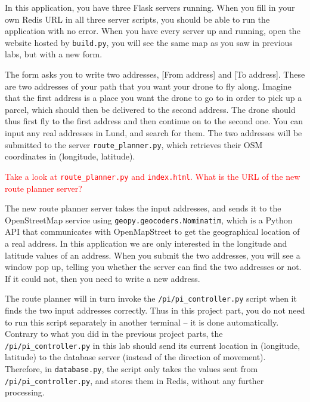 \documentclass{article}
\begin{document}
In this application, you have three Flask servers running. When you fill in your own Redis URL in all three server scripts, you should be able to run the application with no error. When you have every server up and running, open the website hosted by \verb!build.py!, you will see the same map as you saw in previous labs, but with a new form.

The form asks you to write two addresses, [From address] and [To address]. These are two addresses of your path that you want your drone to fly along. Imagine that the first address is a place you want the drone to go to in order to pick up a parcel, which should then be delivered to the second address. The drone should thus first fly to the first address and then continue on to the second one. You can input any real addresses in Lund, and search for them. The two addresses will be submitted to the server \verb!route_planner.py!, which retrieves their OSM coordinates in (longitude, latitude).

\vspace{0.5cm}
\parbox[t]{13cm}{\textcolor{red}{Take a look at \texttt{route\_planner.py} and \texttt{index.html}. What is the URL of the new route planner server?}} \vspace{0.5cm}

\noindent The new route planner server takes the input addresses, and sends it to the OpenStreetMap service using \verb!geopy.geocoders.Nominatim!, which is a Python API that communicates with OpenMapStreet to get the geographical location of a real address. In this application we are only interested in the longitude and latitude values of an address. When you submit the two addresses, you will see a window pop up, telling you whether the server can find the two addresses or not. If it could not, then you need to write a new address.

The route planner will in turn invoke the \verb!/pi/pi_controller.py! script when it finds the two input addresses correctly.
Thus in this project part, you do not need to run this script separately in another terminal -- it is done automatically. Contrary to what you did in the previous project parts, the \verb!/pi/pi_controller.py! in this lab should send its current location in (longitude, latitude) to the database server (instead of the direction of movement). Therefore, in \verb!database.py!, the script only takes the values sent from \verb!/pi/pi_controller.py!, and stores them in Redis, without any further processing.
\end{document}
